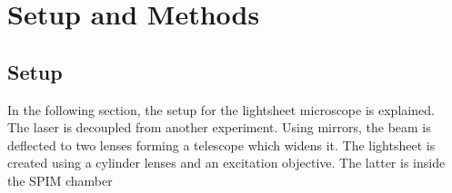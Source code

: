 

\def\skalierung{0.65}

\chapter{Setup and Methods}
\label{chap:methods}
\section{Setup}\label{sec:setup}
In the following section, the setup for the lightsheet microscope is explained. \\
The laser is decoupled from another experiment. Using mirrors, the beam is deflected to two lenses forming a telescope which widens it. The lightsheet is created using a cylinder lenses and an excitation objective. The latter is inside the SPIM chamber
